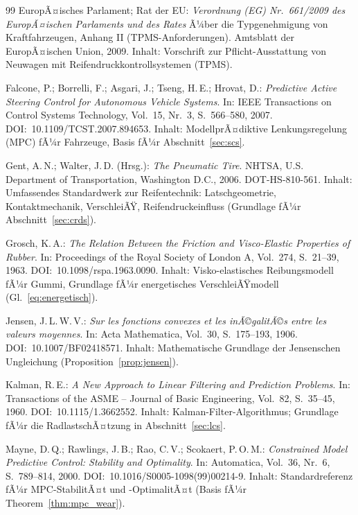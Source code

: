 ﻿\documentclass[12pt,a4paper]{article}
\theoremstyle{definition}
\theoremstyle{remark}
\begin{document}
\begin{thebibliography}{99}
EuropÃ¤isches Parlament; Rat der EU:
\textit{Verordnung (EG) Nr.~661/2009 des EuropÃ¤ischen Parlaments und des Rates}
Ã¼ber die Typgenehmigung von Kraftfahrzeugen, Anhang II (TPMS-Anforderungen).
Amtsblatt der EuropÃ¤ischen Union, 2009.
Inhalt: Vorschrift zur Pflicht-Ausstattung von Neuwagen mit Reifendruckkontrollsystemen (TPMS).

Falcone, P.; Borrelli, F.; Asgari, J.; Tseng, H.\,E.; Hrovat, D.:
\textit{Predictive Active Steering Control for Autonomous Vehicle Systems}.
In: IEEE Transactions on Control Systems Technology, Vol.~15, Nr.~3,
S.~566--580, 2007. DOI:~10.1109/TCST.2007.894653.
Inhalt: ModellprÃ¤diktive Lenkungsregelung (MPC) fÃ¼r Fahrzeuge, Basis fÃ¼r
Abschnitt~\ref{sec:scs}.

Gent, A.\,N.; Walter, J.\,D. (Hrsg.): \textit{The Pneumatic Tire}.
NHTSA, U.S. Department of Transportation, Washington D.C., 2006.
DOT-HS-810-561.
Inhalt: Umfassendes Standardwerk zur Reifentechnik: Latschgeometrie, Kontaktmechanik,
VerschleiÃŸ, Reifendruckeinfluss (Grundlage fÃ¼r Abschnitt~\ref{sec:crds}).

Grosch, K.\,A.: \textit{The Relation Between the Friction and Visco-Elastic Properties
of Rubber}.
In: Proceedings of the Royal Society of London A, Vol.~274, S.~21--39, 1963.
DOI:~10.1098/rspa.1963.0090.
Inhalt: Visko-elastisches Reibungsmodell fÃ¼r Gummi, Grundlage fÃ¼r energetisches
VerschleiÃŸmodell (Gl.~\ref{eq:energetisch}).

Jensen, J.\,L.\,W.\,V.: \textit{Sur les fonctions convexes et les inÃ©galitÃ©s entre
les valeurs moyennes}.
In: Acta Mathematica, Vol.~30, S.~175--193, 1906.
DOI:~10.1007/BF02418571.
Inhalt: Mathematische Grundlage der Jensenschen Ungleichung (Proposition~\ref{prop:jensen}).

Kalman, R.\,E.: \textit{A New Approach to Linear Filtering and Prediction Problems}.
In: Transactions of the ASME -- Journal of Basic Engineering, Vol.~82, S.~35--45, 1960.
DOI:~10.1115/1.3662552.
Inhalt: Kalman-Filter-Algorithmus; Grundlage fÃ¼r die RadlastschÃ¤tzung
in Abschnitt~\ref{sec:lcs}.

Mayne, D.\,Q.; Rawlings, J.\,B.; Rao, C.\,V.; Scokaert, P.\,O.\,M.:
\textit{Constrained Model Predictive Control: Stability and Optimality}.
In: Automatica, Vol.~36, Nr.~6, S.~789--814, 2000.
DOI:~10.1016/S0005-1098(99)00214-9.
Inhalt: Standardreferenz fÃ¼r MPC-StabilitÃ¤t und -OptimalitÃ¤t
(Basis fÃ¼r Theorem~\ref{thm:mpc_wear}).


\end{thebibliography}
\end{document}
